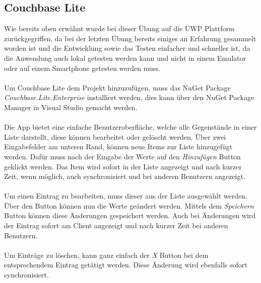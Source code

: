 \subsection{Couchbase Lite}

Wie bereits oben erwähnt wurde bei dieser Übung auf die UWP Plattform zurückgegriffen, da bei der letzten Übung bereits einiges an Erfahrung gesammelt worden ist und die Entwicklung sowie das Testen einfacher und schneller ist, da die Anwendung auch lokal getesten werden kann und nicht in einem Emulator oder auf einem Smartphone getesten werden muss.
\\\\
Um Couchbase Lite dem Projekt hinzuzufügen, muss das NuGet Package \textit{Couchbase.Lite.Enterprise} installiert werden, dies kann über den NuGet Package Manager in Visual Studio gemacht werden.
\\\\
Die App bietet eine einfache Benutzeroberfläche, welche alle Gegenstände in einer Liste darstellt, diese können bearbeitet oder gelöscht werden. Über zwei Eingabefelder am unteren Rand, können neue Items zur Liste hinzugefügt werden. Dafür muss nach der Eingabe der Werte auf den \textit{Hinzufügen} Button geklickt werden. Das Item wird sofort in der Liste angezeigt und nach kurzer Zeit, wenn möglich, auch synchronisiert und bei anderen Benutzern angezeigt.
\\\\
Um einen Eintrag zu bearbeiten, muss dieser aus der Liste ausgewählt werden. Über den  Button können nun die Werte geändert werden. Mittels dem \textit{Speichern} Button können diese Änderungen gespeichert werden. Auch bei Änderungen wird der Eintrag sofort am Client angezeigt und nach kurzer Zeit bei anderen Benutzern.
\\\\
Um Einträge zu löschen, kann ganz einfach der \textit{X} Button bei dem entsprechendem Eintrag getätigt werden. Diese Änderung wird ebenfalls sofort synchronisiert.

